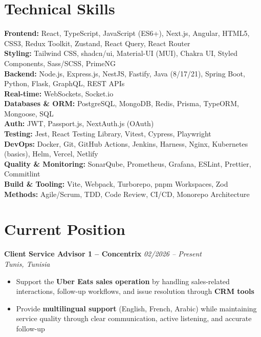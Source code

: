 \documentclass[10pt,a4paper]{article}
\begin{document}
\section*{Technical Skills}
{\small
\textbf{Frontend:} React, TypeScript, JavaScript (ES6+), Next.js, Angular, HTML5, CSS3, Redux Toolkit, Zustand, React Query, React Router\\[2pt]
\textbf{Styling:} Tailwind CSS, shadcn/ui, Material-UI (MUI), Chakra UI, Styled Components, Sass/SCSS, PrimeNG\\[2pt]
\textbf{Backend:} Node.js, Express.js, NestJS, Fastify, Java (8/17/21), Spring Boot, Python, Flask, GraphQL, REST APIs\\[2pt]
\textbf{Real-time:} WebSockets, Socket.io\\[2pt]
\textbf{Databases \& ORM:} PostgreSQL, MongoDB, Redis, Prisma, TypeORM, Mongoose, SQL\\[2pt]
\textbf{Auth:} JWT, Passport.js, NextAuth.js (OAuth)\\[2pt]
\textbf{Testing:} Jest, React Testing Library, Vitest, Cypress, Playwright\\[2pt]
\textbf{DevOps:} Docker, Git, GitHub Actions, Jenkins, Harness, Nginx, Kubernetes (basics), Helm, Vercel, Netlify\\[2pt]
\textbf{Quality \& Monitoring:} SonarQube, Prometheus, Grafana, ESLint, Prettier, Commitlint\\[2pt]
\textbf{Build \& Tooling:} Vite, Webpack, Turborepo, pnpm Workspaces, Zod\\[2pt]
\textbf{Methods:} Agile/Scrum, TDD, Code Review, CI/CD, Monorepo Architecture
}

\section*{Current Position}
{\small
\textbf{Client Service Advisor 1 -- Concentrix} \hfill \textit{02/2026 -- Present}\\[1pt]
\textit{Tunis, Tunisia}
\begin{itemize}
  \item Support the \textbf{Uber Eats sales operation} by handling sales-related interactions, follow-up workflows, and issue resolution through \textbf{CRM tools}
  \item Provide \textbf{multilingual support} (English, French, Arabic) while maintaining service quality through clear communication, active listening, and accurate follow-up
\end{itemize}
}
\end{document}
